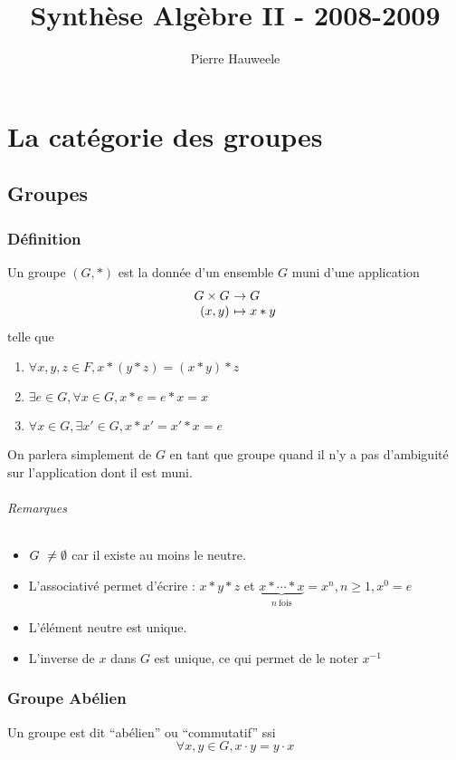 \documentclass[a4paper,10pt]{report}
\author{Pierre Hauweele}
\title{Synthèse Algèbre II - 2008-2009}
\date{}
\newcommand{\underb}[2]{\underset{ #1 }{\underbrace{ #2 }}}
\begin{document}
\maketitle
\tableofcontents
\newpage
\part{La catégorie des groupes}
 \chapter{Groupes}
  \section{Définition}
   Un groupe \((G, *)\) est la donnée d'un ensemble $G$ muni d'une application 
   $$
   \begin{array}[t]{r@{\ }l}
     G \times G &\to G\\
     (x,y) &\mapsto x * y
   \end{array}$$
   telle que 
   \begin{enumerate}
     \item $\forall x,y,z \in F, x*(y*z)=(x*y)*z$
     \item $\exists e \in G, \forall x \in G, x*e = e*x = x$
     \item $\forall x \in G, \exists x' \in G, x*x'=x'*x=e$
   \end{enumerate}

   On parlera simplement de \(G\) en tant que groupe quand il n'y a pas d'ambiguité sur l'application dont il est muni.
   
   \paragraph{Remarques}
   \begin{itemize}
     \item $G\nobreakspace\ne \emptyset$ car il existe au moins le neutre.
     \item L'associativé permet d'écrire : $x*y*z$ et
       $\underb{n \ \mathrm{fois}}{x*\cdots*x}=x^n, n \ge 1, x^0=e$
     \item L'élément neutre est unique. 
     \item L'inverse de $x$ dans $G$ est unique,
       ce qui permet de le noter $x^{-1}$
   \end{itemize}

  \section{Groupe Abélien}
   Un groupe est dit ``abélien'' ou ``commutatif'' ssi
   $$\forall x,y \in G, x \cdot y=y \cdot x$$
\end{document}
